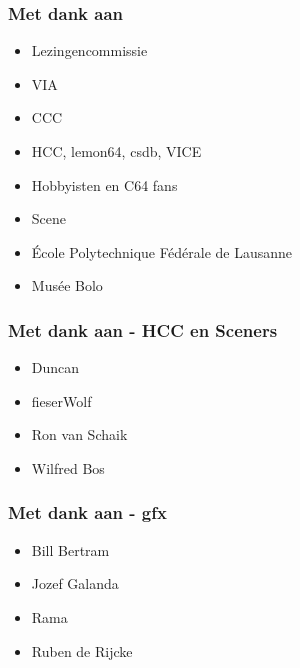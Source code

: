 \begin{frame}
\frametitle{Met dank aan}

\begin{itemize}
\item Lezingencommissie
\item VIA
\item CCC
\item HCC, lemon64, csdb, VICE
\item Hobbyisten en C64 fans
\item Scene
\item \'Ecole Polytechnique F\'ed\'erale de Lausanne
\item Mus\'ee Bolo
\end{itemize}

\end{frame}


\begin{frame}
\frametitle{Met dank aan - HCC en Sceners}

\begin{itemize}
\item Duncan
\item fieserWolf
\item Ron van Schaik
\item Wilfred Bos
\end{itemize}

\end{frame}


\begin{frame}
\frametitle{Met dank aan - gfx}

\begin{itemize}
\item Bill Bertram
\item Jozef Galanda
\item Rama
\item Ruben de Rijcke
\end{itemize}

\end{frame}


